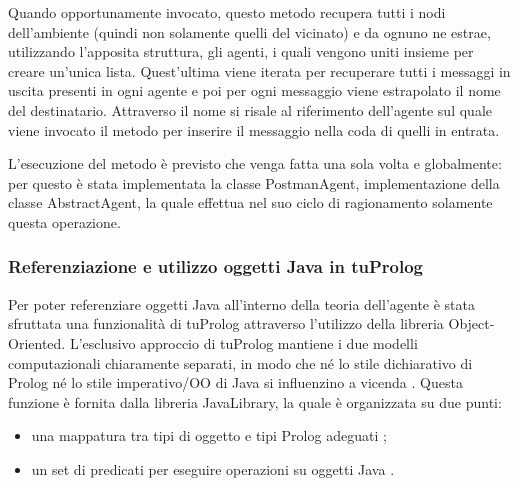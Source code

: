 Quando opportunamente invocato, questo metodo recupera tutti i nodi dell'ambiente (quindi non solamente quelli del vicinato) e da ognuno ne estrae, utilizzando l'apposita struttura, gli agenti, i quali vengono uniti insieme per creare un'unica lista. Quest'ultima viene iterata per recuperare tutti i messaggi in uscita presenti in ogni agente e poi per ogni messaggio viene estrapolato il nome del destinatario. Attraverso il nome si risale al riferimento dell'agente sul quale viene invocato il metodo per inserire il messaggio nella coda di quelli in entrata.

L'esecuzione del metodo è previsto che venga fatta una sola volta e globalmente: per questo è stata implementata la classe PostmanAgent, implementazione della classe AbstractAgent, la quale effettua nel suo ciclo di ragionamento solamente questa operazione.

\subsubsection{Referenziazione e utilizzo oggetti Java in tuProlog}
Per poter referenziare oggetti Java all'interno della teoria dell'agente è stata sfruttata una funzionalità di tuProlog attraverso l'utilizzo della libreria Object-Oriented.
L'esclusivo approccio di tuProlog mantiene i due modelli computazionali chiaramente separati, in modo che né lo stile dichiarativo di Prolog né lo stile imperativo/OO di Java si influenzino a vicenda \cite{2p-alpnews2013}.
Questa funzione è fornita dalla libreria JavaLibrary, la quale è organizzata su due punti:
\begin{itemize}
   \item una mappatura tra tipi di oggetto e tipi Prolog adeguati \cite{2p-alpnews2013};
   \item un set di predicati per eseguire operazioni su oggetti Java \cite{2p-alpnews2013}.
\end{itemize}

